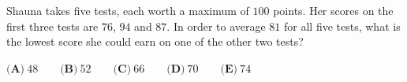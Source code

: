 Shauna takes five tests, each worth a maximum of $100$ points. Her scores on the first three tests are $76$, $94$ and $87$. In order to average $81$ for all five tests, what is the lowest score she could earn on one of the other two tests?

$\textbf{(A)}\ 48\qquad\textbf{(B)}\ 52\qquad\textbf{(C)}\ 66\qquad\textbf{(D)}\ 70\qquad\textbf{(E)}\ 74$
